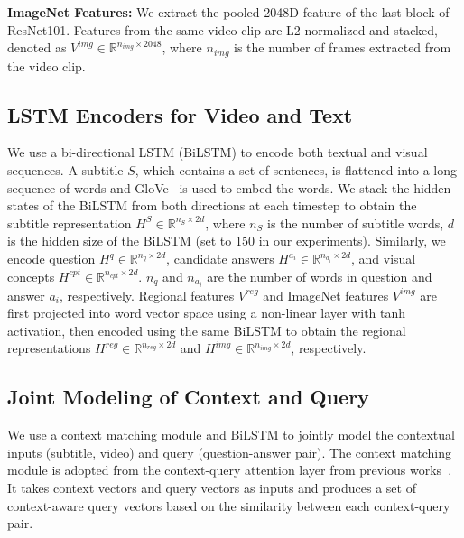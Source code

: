\documentclass[11pt,a4paper]{article}
\begin{document}
\noindent\textbf{ImageNet Features:} 
We extract the pooled 2048D feature of the last block of ResNet101. 
Features from the same video clip are L2 normalized and stacked, denoted as  $V^{img} \in \mathbb{R}^{n_{img} \times 2048}$, where $n_{img}$ is the number of frames extracted from the video clip.


\subsection{LSTM Encoders for Video and Text}
We use a bi-directional LSTM (BiLSTM) to encode both textual and visual sequences. 
A subtitle $S$, which contains a set of sentences, is flattened into a long sequence of words and GloVe~\citep{Pennington2014GloveGV} is used to embed the words. 
We stack the hidden states of the BiLSTM from both directions at each timestep to obtain the subtitle representation $H^{S} \in \mathbb{R}^{n_S \times 2d}$, where $n_S$ is the number of subtitle words, $d$ is the hidden size of the BiLSTM (set to 150 in our experiments). 
Similarly, we encode question $H^q \in \mathbb{R}^{n_q \times 2d}$, candidate answers $H^{a_i} \in \mathbb{R}^{n_{a_i} \times 2d}$, and visual concepts $H^{cpt} \in \mathbb{R}^{n_{cpt} \times 2d}$.  $n_q$ and $n_{a_i}$ are the number of words in question and answer $a_i$, respectively.
Regional features $V^{reg}$ and ImageNet features $V^{img}$ are first projected into word vector space using a non-linear layer with tanh activation, then encoded using the same BiLSTM to obtain the regional representations $H^{reg} \in \mathbb{R}^{n_{reg} \times 2d}$ and $H^{img} \in \mathbb{R}^{n_{img} \times 2d}$, respectively.

\subsection{Joint Modeling of Context and Query}

We use a context matching module and BiLSTM to jointly model the contextual inputs (subtitle, video) and query (question-answer pair).
The context matching module is adopted from the context-query attention layer from previous works~\citep{Seo2016BidirectionalAF, Yu2018QANetCL}.
It takes context vectors and query vectors as inputs and produces a set of context-aware query vectors based on the similarity between each context-query  pair. 
\end{document}
